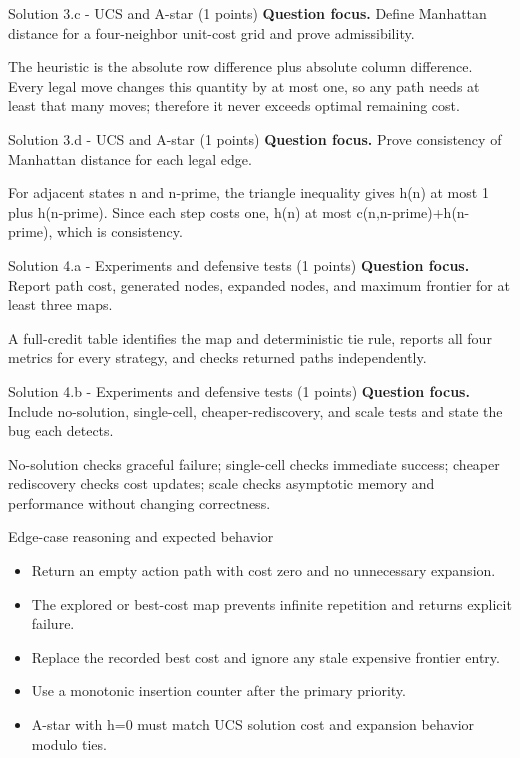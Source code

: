 \documentclass[aspectratio=169,11pt]{beamer}
\begin{document}
\begin{frame}{Solution 3.c - UCS and A-star (1 points)}
\small
\textbf{Question focus.} Define Manhattan distance for a four-neighbor unit-cost grid and prove admissibility.

\vspace{0.25cm}
\answerlabel The heuristic is the absolute row difference plus absolute column difference. Every legal move changes this quantity by at most one, so any path needs at least that many moves; therefore it never exceeds optimal remaining cost.
\end{frame}

\begin{frame}{Solution 3.d - UCS and A-star (1 points)}
\small
\textbf{Question focus.} Prove consistency of Manhattan distance for each legal edge.

\vspace{0.25cm}
\answerlabel For adjacent states n and n-prime, the triangle inequality gives h(n) at most 1 plus h(n-prime). Since each step costs one, h(n) at most c(n,n-prime)+h(n-prime), which is consistency.
\end{frame}

\begin{frame}{Solution 4.a - Experiments and defensive tests (1 points)}
\small
\textbf{Question focus.} Report path cost, generated nodes, expanded nodes, and maximum frontier for at least three maps.

\vspace{0.25cm}
\answerlabel A full-credit table identifies the map and deterministic tie rule, reports all four metrics for every strategy, and checks returned paths independently.
\end{frame}

\begin{frame}{Solution 4.b - Experiments and defensive tests (1 points)}
\small
\textbf{Question focus.} Include no-solution, single-cell, cheaper-rediscovery, and scale tests and state the bug each detects.

\vspace{0.25cm}
\answerlabel No-solution checks graceful failure; single-cell checks immediate success; cheaper rediscovery checks cost updates; scale checks asymptotic memory and performance without changing correctness.
\end{frame}

\begin{frame}{Edge-case reasoning and expected behavior}
\small
\begin{itemize}
  \item Return an empty action path with cost zero and no unnecessary expansion.
  \item The explored or best-cost map prevents infinite repetition and returns explicit failure.
  \item Replace the recorded best cost and ignore any stale expensive frontier entry.
  \item Use a monotonic insertion counter after the primary priority.
  \item A-star with h=0 must match UCS solution cost and expansion behavior modulo ties.
\end{itemize}
\end{frame}
\end{document}
